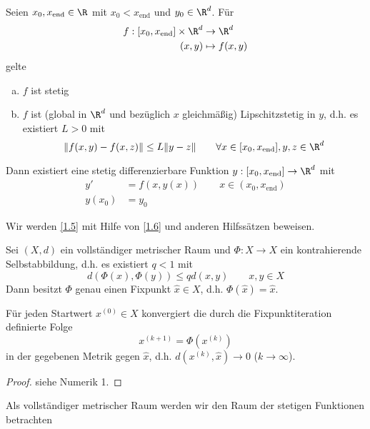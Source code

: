\documentclass[
]{mycourse}
\begin{document}
\begin{st} \label{1.5}
	Seien $x_0, x_{\text{end}} \in \R$ mit $x_0 < x_{\text{end}}$ und $y_0 \in \R^d$.
	Für
	\begin{align*}
		f: [x_0, x_{\text{end}}] \times \R^d &\to \R^d \\
		(x,y) & \mapsto f(x,y)
	\end{align*}
	gelte
	\begin{enumerate}[a)]
		\item
			$f$ ist stetig
		\item
			$f$ ist (global in $\R^d$ und bezüglich $x$ gleichmäßig) Lipschitzstetig in $y$, d.h. es existiert $L > 0$ mit
			\[
				\|f(x,y) - f(x,z)\| \le L \|y-z\|
				\qquad \forall x\in [x_0,x_{\text{end}}], y,z \in \R^d
			\]
	\end{enumerate}
	Dann existiert eine stetig differenzierbare Funktion $y : [x_0,x_{\text{end}}] \to \R^d$ mit
	\begin{align*}
		y' &= f(x,y(x)) \qquad x\in(x_0,x_{\text{end}}) \\
		y(x_0) &= y_0
	\end{align*}
\end{st}

Wir werden \ref{1.5} mit Hilfe von \ref{1.6} und anderen Hilfssätzen beweisen.

\begin{st} \label{1.6}
	Sei $(X,d)$ ein vollständiger metrischer Raum und $\Phi: X \to X$ ein kontrahierende Selbstabbildung, d.h. es existiert $q < 1$ mit
	\[
		d(\Phi(x), \Phi(y)) \le q d(x,y)
		\qquad x,y \in X
	\]
	Dann besitzt $\Phi$ genau einen Fixpunkt $\hat x \in X$, d.h. $\Phi(\hat x) = \hat x$.

	Für jeden Startwert $x^{(0)} \in X$ konvergiert die durch die Fixpunktiteration definierte Folge
	\[
		x^{(k+1)} = \Phi(x^{(k)})
	\]
	in der gegebenen Metrik gegen $\hat x$, d.h. $d(x^{(k)},\hat x) \to 0$ ($k \to \infty$).
	\begin{proof}
		siehe Numerik 1.
	\end{proof}
\end{st}


Als vollständiger metrischer Raum werden wir den Raum der stetigen Funktionen betrachten
\end{document}
